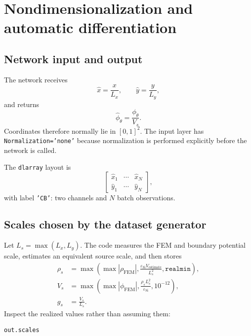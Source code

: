 \documentclass[11pt]{article}
\newcommand{\phinn}{\ensuremath{\phi_{\theta}}}
\begin{document}
\section{Nondimensionalization and automatic differentiation}

\subsection{Network input and output}

The network receives
\begin{equation}
\hat{x}=\frac{x}{L_x},\qquad
\hat{y}=\frac{y}{L_y},
\end{equation}
and returns
\begin{equation}
\hat{\phi}_{\theta}=\frac{\phinn}{V_s}.
\end{equation}
Coordinates therefore normally lie in $[0,1]^2$. The input layer has \texttt{Normalization='none'} because normalization is performed explicitly before the network is called.

The \texttt{dlarray} layout is
\begin{equation}
\begin{bmatrix}
\hat{x}_1 & \cdots & \hat{x}_N\\
\hat{y}_1 & \cdots & \hat{y}_N
\end{bmatrix},
\end{equation}
with label \texttt{'CB'}: two channels and $N$ batch observations.

\subsection{Scales chosen by the dataset generator}

Let $L_s=\max(L_x,L_y)$. The code measures the FEM and boundary potential scale, estimates an equivalent source scale, and then stores
\begin{align}
\rho_s & = \max\left(\max|\rho_{\mathrm{FEM}}|,
\frac{\varepsilon_{\mathrm{Si}}V_{\mathrm{estimate}}}{L_s^2},
\texttt{realmin}\right),\\
V_s & = \max\left(\max|\phi_{\mathrm{FEM}}|,
\frac{\rho_sL_s^2}{\varepsilon_{\mathrm{Si}}},10^{-12}\right),\\
g_s & = \frac{V_s}{L_s}.
\end{align}
Inspect the realized values rather than assuming them:
\begin{lstlisting}[style=projectmatlab]
out.scales
\end{lstlisting}
\end{document}
